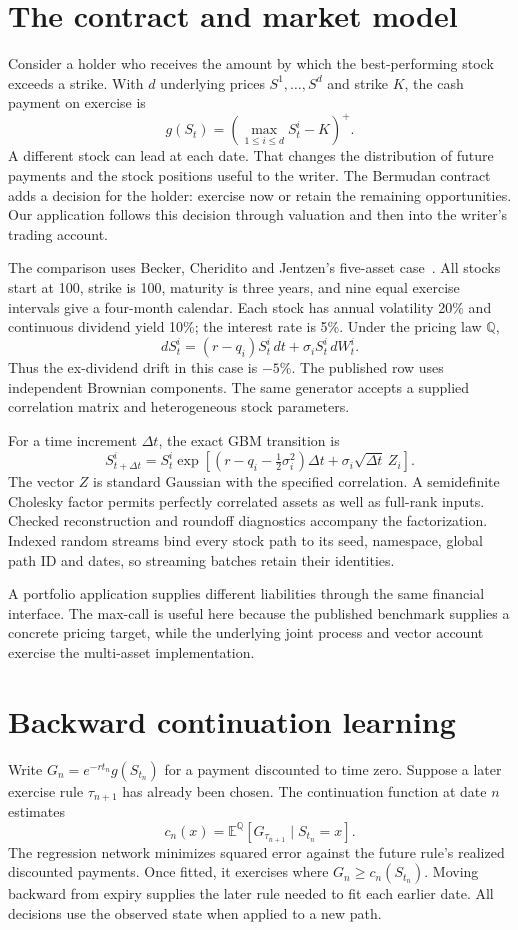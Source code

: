\documentclass[8pt]{strategynet-journal}
\newcommand{\E}{\mathbb E}
\newcommand{\Q}{\mathbb Q}
\begin{document}
\begin{SNcolumns}

\section{The contract and market model}
Consider a holder who receives the amount by which the best-performing stock
exceeds a strike. With $d$ underlying prices $S^1,\ldots,S^d$ and strike $K$,
the cash payment on exercise is
\[
 g(S_t)=\left(\max_{1\leq i\leq d} S_t^i-K\right)^+.
\]
A different stock can lead at each date. That changes the distribution of
future payments and the stock positions useful to the writer. The Bermudan
contract adds a decision for the holder: exercise now or retain the remaining
opportunities. Our application follows this decision through valuation and
then into the writer's trading account.

The comparison uses Becker, Cheridito and Jentzen's five-asset case~\cite{american}.
All stocks start at 100, strike is 100, maturity is three years, and nine equal
exercise intervals give a four-month calendar. Each stock has annual volatility
20\% and continuous dividend yield 10\%; the interest rate is 5\%. Under the
pricing law $\Q$,
\[
 dS_t^i=(r-q_i)S_t^i\,dt+\sigma_i S_t^i\,dW_t^i.
\]
Thus the ex-dividend drift in this case is $-5\%$. The published row uses
independent Brownian components. The same generator accepts a supplied
correlation matrix and heterogeneous stock parameters.

For a time increment $\Delta t$, the exact GBM transition is
\[
 S_{t+\Delta t}^i=S_t^i\exp\!\left[
 (r-q_i-\tfrac12\sigma_i^2)\Delta t+
 \sigma_i\sqrt{\Delta t}\,Z_i\right].
\]
The vector $Z$ is standard Gaussian with the specified correlation. A
semidefinite Cholesky factor permits perfectly correlated assets as well as
full-rank inputs. Checked reconstruction and roundoff diagnostics accompany
the factorization. Indexed random streams bind every stock path to its seed,
namespace, global path ID and dates, so streaming batches retain their identities.

A portfolio application supplies different liabilities through the same
financial interface. The max-call is useful here because the published
benchmark supplies a concrete pricing target, while the underlying joint
process and vector account exercise the multi-asset implementation.

\section{Backward continuation learning}
Write $G_n=e^{-rt_n}g(S_{t_n})$ for a payment discounted to time zero. Suppose
a later exercise rule $\tau_{n+1}$ has already been chosen. The continuation
function at date $n$ estimates
\[
 c_n(x)=\E^{\Q}[G_{\tau_{n+1}}\mid S_{t_n}=x].
\]
The regression network minimizes squared error against the future rule's
realized discounted payments. Once fitted, it exercises where
$G_n\geq c_n(S_{t_n})$. Moving backward from expiry supplies the later rule
needed to fit each earlier date. All decisions use the observed state when
applied to a new path.


\end{SNcolumns}
\end{document}
